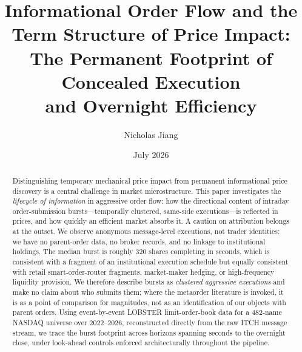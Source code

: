 \documentclass[11pt]{article}
\title{Informational Order Flow and the Term Structure of Price Impact:\\ The Permanent Footprint of Concealed Execution\\ and Overnight Efficiency}
\author{Nicholas Jiang}
\date{July 2026}
\begin{document}
\maketitle

\begin{abstract}
Distinguishing temporary mechanical price impact from permanent informational price discovery is a central challenge in market microstructure. This paper investigates the \emph{lifecycle of information} in aggressive order flow: how the directional content of intraday order-submission bursts---temporally clustered, same-side executions---is reflected in prices, and how quickly an efficient market absorbs it. A caution on attribution belongs at the outset. We observe anonymous message-level executions, not trader identities: we have no parent-order data, no broker records, and no linkage to institutional holdings. The median burst is roughly $320$ shares completing in seconds, which is consistent with a fragment of an institutional execution schedule but equally consistent with retail smart-order-router fragments, market-maker hedging, or high-frequency liquidity provision. We therefore describe bursts as \emph{clustered aggressive executions} and make no claim about who submits them; where the metaorder literature is invoked, it is as a point of comparison for magnitudes, not as an identification of our objects with parent orders. Using event-by-event LOBSTER limit-order-book data for a 482-name NASDAQ universe over 2022--2026, reconstructed directly from the raw ITCH message stream, we trace the burst footprint across horizons spanning seconds to the overnight close, under look-ahead controls enforced architecturally throughout the pipeline.


\end{abstract}
\end{document}

